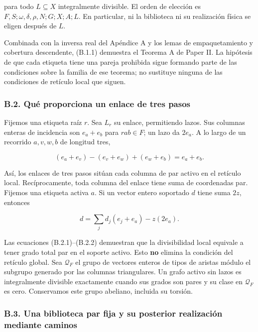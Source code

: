 \documentclass[spanish,11pt,a4paper]{article}
\begin{document}
para todo \(L\subseteq X\) integralmente divisible. El orden de elección es \(F,S;\omega,\delta,\rho,N;G;X;A;L\). En particular, ni la biblioteca ni su realización física se eligen después de \(L\).

Combinada con la inversa real del Apéndice A y los lemas de empaquetamiento y cobertura descendente, (B.1.1) demuestra el Teorema A de Paper II. La hipótesis de que cada etiqueta tiene una pareja prohibida sigue formando parte de las condiciones sobre la familia de ese teorema; no sustituye ninguna de las condiciones de retículo local que siguen.

\subsubsection{B.2. Qué proporciona un enlace de tres pasos}\label{b.2.-quuxe9-proporciona-un-enlace-de-tres-pasos}

Fijemos una etiqueta raíz \(r\). Sea \(L_r\) su enlace, permitiendo lazos. Sus columnas enteras de incidencia son \(e_a+e_b\) para \(rab\in F\); un lazo da \(2e_a\). A lo largo de un recorrido \(a,v,w,b\) de longitud tres,

\[(e_a+e_v)-(e_v+e_w)+(e_w+e_b)=e_a+e_b.
\tag{B.2.1}\]

Así, los enlaces de tres pasos sitúan cada columna de par activo en el retículo local. Recíprocamente, toda columna del enlace tiene suma de coordenadas par. Fijemos una etiqueta activa \(a\). Si un vector entero soportado \(d\) tiene suma \(2z\), entonces

\[d=\sum_jd_j(e_j+e_a)-z(2e_a).
\tag{B.2.2}\]

Las ecuaciones (B.2.1)--(B.2.2) demuestran que la divisibilidad local equivale a tener grado total par en el soporte activo. Esto \textbf{no} elimina la condición del retículo global. Sea \(\mathcal Q_F\) el grupo de vectores enteros de tipos de aristas módulo el subgrupo generado por las columnas triangulares. Un grafo activo sin lazos es integralmente divisible exactamente cuando sus grados son pares y su clase en \(\mathcal Q_F\) es cero. Conservamos este grupo abeliano, incluida su torsión.

\subsubsection{B.3. Una biblioteca par fija y su posterior realización mediante caminos}\label{b.3.-una-biblioteca-par-fija-y-su-posterior-realizaciuxf3n-mediante-caminos}
\end{document}
